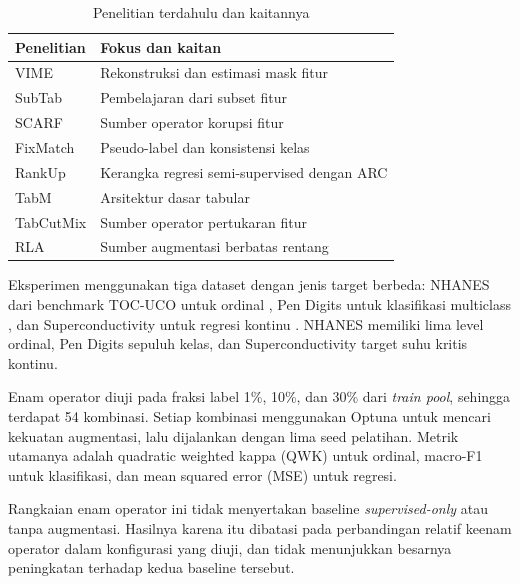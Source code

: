 \begin{table}[!t]
\caption{Penelitian terdahulu dan kaitannya}
\label{tab:iv}
\centering
\footnotesize
\setlength{\tabcolsep}{3pt}
\renewcommand{\arraystretch}{1.05}
\begin{tabularx}{\columnwidth}{p{}X}
\hline
\textbf{Penelitian} & \textbf{Fokus dan kaitan} \\
\hline
VIME \cite{ref5} & Rekonstruksi dan estimasi mask fitur \\
SubTab \cite{ref6} & Pembelajaran dari subset fitur \\
SCARF \cite{ref7} & Sumber operator korupsi fitur \\
FixMatch \cite{ref9} & Pseudo-label dan konsistensi kelas \\
RankUp \cite{ref10} & Kerangka regresi semi-supervised dengan ARC \\
TabM \cite{ref11} & Arsitektur dasar tabular \\
TabCutMix \cite{ref12} & Sumber operator pertukaran fitur \\
RLA \cite{ref13} & Sumber augmentasi berbatas rentang \\
\hline
\end{tabularx}
\end{table}

Eksperimen menggunakan tiga dataset dengan jenis target berbeda: NHANES dari benchmark TOC-UCO untuk ordinal \cite{ref14}, Pen Digits untuk klasifikasi multiclass \cite{ref15}, dan Superconductivity untuk regresi kontinu \cite{ref16}. NHANES memiliki lima level ordinal, Pen Digits sepuluh kelas, dan Superconductivity target suhu kritis kontinu.

Enam operator diuji pada fraksi label 1\%, 10\%, dan 30\% dari \textit{train pool}, sehingga terdapat 54 kombinasi. Setiap kombinasi menggunakan Optuna untuk mencari kekuatan augmentasi, lalu dijalankan dengan lima seed pelatihan. Metrik utamanya adalah quadratic weighted kappa (QWK) untuk ordinal, macro-F1 untuk klasifikasi, dan mean squared error (MSE) untuk regresi.

Rangkaian enam operator ini tidak menyertakan baseline \textit{supervised-only} atau tanpa augmentasi. Hasilnya karena itu dibatasi pada perbandingan relatif keenam operator dalam konfigurasi yang diuji, dan tidak menunjukkan besarnya peningkatan terhadap kedua baseline tersebut.
